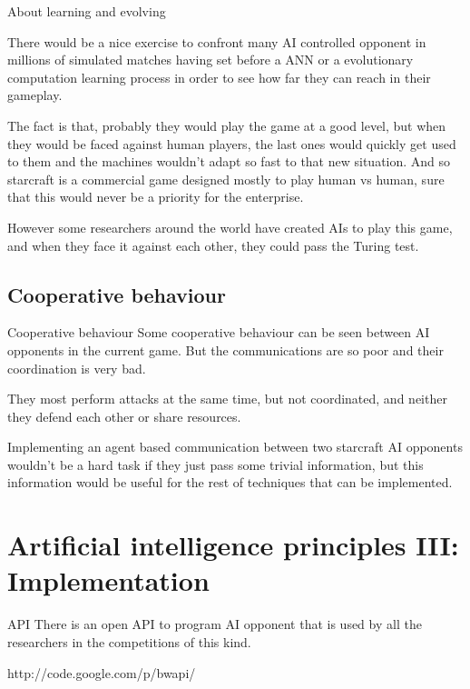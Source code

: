 \documentclass[10pt]{beamer}
\begin{document}
\begin{frame}{About learning and evolving}
 
There would be a nice exercise to confront many AI controlled opponent in millions of simulated matches having set before a ANN or a evolutionary computation learning process in order to see how far they can reach in their gameplay.
\newline

The fact is that, probably they would play the game at a good level, but when they would be faced against human players, the last ones would quickly get used to them and the machines wouldn't adapt so fast to that new situation. And so starcraft is a commercial game designed mostly to play human vs human, sure that this would never be a priority for the enterprise.
\newline

However some researchers around the world have created AIs to play this game, and when they face it against each other, they could pass the Turing test.
\end{frame}

\subsection{Cooperative behaviour}

\begin{frame}{Cooperative behaviour}
 Some cooperative behaviour can be seen between AI opponents in the current game. But the communications are so poor and their coordination is very bad.
\newline


 They most perform attacks at the same time, but not coordinated, and neither they defend each other or share resources.
\newline

 Implementing an agent based communication between two starcraft AI opponents wouldn't be a hard task if they just pass some trivial information, but this information would be useful for the rest of techniques that can be implemented. 
\end{frame}

\section{Artificial intelligence principles III: Implementation}

  \begin{frame}{API}
   There is an open API to program AI opponent that is used by all the researchers in the competitions of this kind.
\newline

http://code.google.com/p/bwapi/
  \end{frame}
\end{document}
